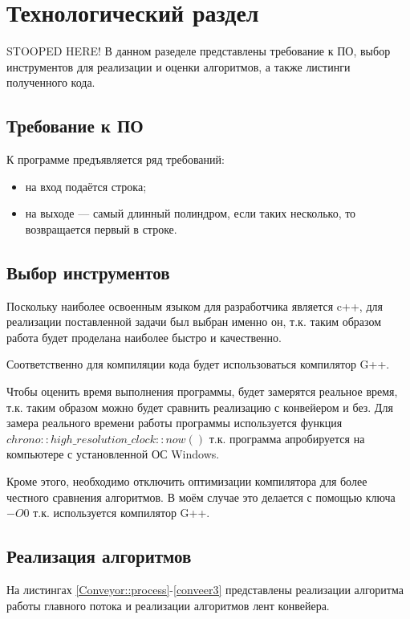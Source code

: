 \chapter{Технологический раздел}
STOOPED HERE!
В данном разеделе представлены требование к ПО, выбор инструментов для реализации и оценки алгоритмов, а также листинги полученного кода.

\section{Требование к ПО}

К программе предъявляется ряд требований:

\begin{itemize}
	\item на вход подаётся строка;
	\item на выходе — самый длинный полиндром, если таких несколько, то возвращается первый в строке.
\end{itemize}

\section{Выбор инструментов}
Поскольку наиболее освоенным языком для разработчика является c++, для реализации поставленной задачи был выбран именно он, т.к. таким образом работа будет проделана наиболее быстро и качественно.

Соответственно для компиляции кода будет использоваться компилятор G++.

Чтобы оценить время выполнения программы, будет замерятся реальное время, т.к. таким образом можно будет сравнить реализацию с конвейером и без. Для замера реального времени работы программы используется функция $chrono::high\_resolution\_clock::now()$ т.к. программа апробируется на компьютере с установленной ОС Windows. \cite{chrono}

Кроме этого, необходимо отключить оптимизации компилятора для более честного сравнения алгоритмов. В моём случае это делается с помощью ключа $-O0$ т.к. используется компилятор G++. \cite{gcc_optimization}

\section{Реализация алгоритмов}
На листингах \ref{Conveyor::process}-\ref{conveer3} представлены реализации алгоритма работы главного потока и реализации алгоритмов лент конвейера.

